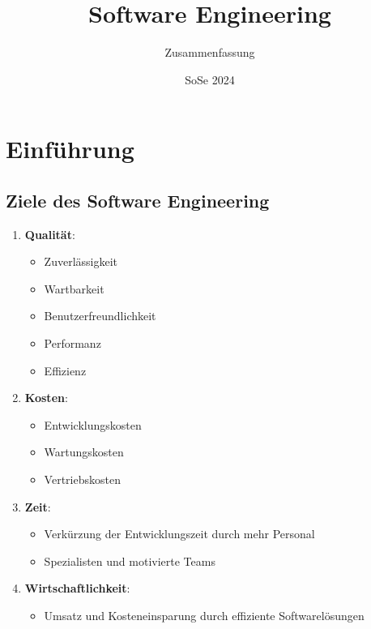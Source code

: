 \documentclass[11pt, a4paper]{article}
\title{Software Engineering}
\author{Zusammenfassung}
\date{SoSe 2024}
\begin{document}
\maketitle

\tableofcontents
\newpage




\section{Einführung} %

\subsection{Ziele des Software Engineering}

\begin{enumerate}
    \item \textbf{Qualität}:
    \begin{itemize}
        \item Zuverlässigkeit
        \item Wartbarkeit
        \item Benutzerfreundlichkeit
        \item Performanz
        \item Effizienz
    \end{itemize}

    \item \textbf{Kosten}:
    \begin{itemize}
        \item Entwicklungskosten
        \item Wartungskosten
        \item Vertriebskosten
    \end{itemize}

    \item \textbf{Zeit}:
    \begin{itemize}
        \item Verkürzung der Entwicklungszeit durch mehr Personal
        \item Spezialisten und motivierte Teams
    \end{itemize}

    \item \textbf{Wirtschaftlichkeit}:
    \begin{itemize}
        \item Umsatz und Kosteneinsparung durch effiziente Softwarelösungen
    \end{itemize}
\end{enumerate}
\end{document}
